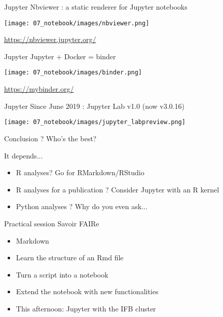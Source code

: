 \begin{frame}{Jupyter}
Nbviewer : a static renderer for Jupyter notebooks

\begin{center}
    \texttt{[image: 07\_notebook/images/nbviewer.png]}
\end{center}

\url{https://nbviewer.jupyter.org/}
\end{frame}

\begin{frame}{Jupyter}
Jupyter + Docker = binder

\begin{center}
    \texttt{[image: 07\_notebook/images/binder.png]}
\end{center}

\url{https://mybinder.org/}
\end{frame}

\begin{frame}{Jupyter}
Since June 2019 : Jupyter Lab v1.0 (now v3.0.16)

\begin{center}
    \texttt{[image: 07\_notebook/images/jupyter\_labpreview.png]}
\end{center}

\end{frame}

\begin{frame}{Conclusion ?}
Who's the best? \newline \pause 

It depends... \pause

\begin{itemize}
    \item<2-> R analyses? Go for RMarkdown/RStudio
    \item<3-> R analyses for a publication ? Consider Jupyter with an R kernel
    \item<4-> Python analyses ? Why do you even ask... 
\end{itemize}

\end{frame}

\begin{frame}{Practical session}
Savoir FAIRe

\begin{itemize}
  \item Markdown
  \item Learn the structure of an Rmd file
  \item Turn a script into a notebook
  \item Extend the notebook with new functionalities
  \item This afternoon: Jupyter with the IFB cluster
\end{itemize}
\end{frame}

